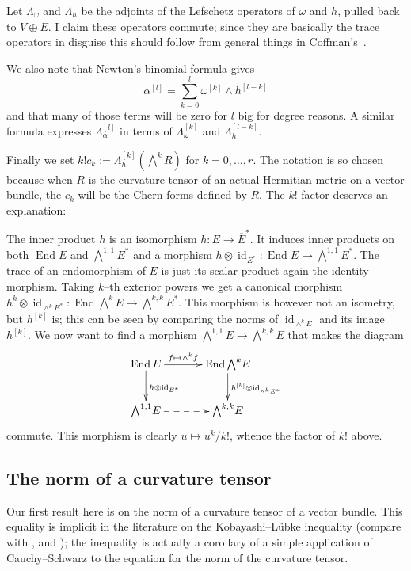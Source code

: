\documentclass[11pt,a4paper]{amsart}
\def\^#1{^{[#1]}}
\DeclareMathOperator{\id}{id}
\DeclareMathOperator{\End}{End}
\theoremstyle{definition}
\theoremstyle{remark}
\numberwithin{equation}{section}
\begin{document}
Let $\Lambda_\omega$ and $\Lambda_h$ be the adjoints of the Lefschetz
operators of $\omega$ and $h$, pulled back to $V \oplus E$. I claim these
operators commute; since they are basically the trace operators in disguise
this should follow from general things in Coffman's~\cite{Coffman}. 

We also note that Newton's binomial formula gives
$$
\alpha\^{l} = \sum_{k=0}^{l} \omega\^{k} \wedge h\^{l-k}
$$
and that many of those terms will be zero for $l$ big for degree
reasons. A similar formula expresses $\Lambda\^{l}_\alpha$ in terms of
$\Lambda\^{k}_\omega$ and $\Lambda\^{l-k}_h$.

Finally we set $k! c_k := \Lambda\^{k}_h (\bigwedge^k \! R)$ for $k = 0, \ldots,
r$.  The notation is so chosen because when $R$ is the curvature tensor of
an actual Hermitian metric on a vector bundle, the $c_k$ will be the Chern
forms defined by $R$. The $k!$ factor deserves an explanation:

The inner product $h$ is an isomorphism $h : E \to \overline E^*$. It
induces inner products on both $\End E$ and $\bigwedge^{1,1} \! E^*$ and a
morphism $h  \otimes \id_{E^*}: \End E \to \bigwedge^{1,1} \!
E^*$. The trace of an endomorphism of $E$ is just its scalar product
again the identity morphism.  Taking $k$--th exterior powers we get a
canonical morphism
$h^k \otimes \id_{\wedge^k E^*} : \End \bigwedge^k \! E \to
\bigwedge^{k,k} \! E^*$. This morphism is however not an isometry, but
$h\^k$ is; this can be seen by comparing the norms of $\id_{\wedge^k
E}$ and its image $h\^k$. We now want to find a morphism
$\bigwedge^{1,1} \! E \to \bigwedge^{k,k} \! E$ that makes the diagram
$$
\xymatrix@C+10pt{
    \End E \ar[r]^-{f \mapsto \wedge^k f} \ar[d]^{h \otimes \id_{E^*}} & 
    \End \bigwedge^{k} \! E \ar[d]^{h\^k \otimes \id_{\wedge^k E^*}} \\
    \bigwedge^{1,1} \! E \ar@{-->}[r] 
    & \bigwedge^{k,k} \! E
}
$$
commute. This morphism is clearly $u \mapsto u^k / k!$, whence the factor
of $k!$ above.



\subsection*{The norm of a curvature tensor}

Our first result here is on the norm of a curvature tensor of a vector
bundle. This equality is implicit in the literature on the
Kobayashi--L\"{u}bke inequality (compare with \cite{Chen-Ogiue},
\cite{Lubke} and \cite{Siu}); the inequality is actually a corollary of a
simple application of Cauchy--Schwarz to the equation for the norm of the
curvature tensor.
\end{document}
